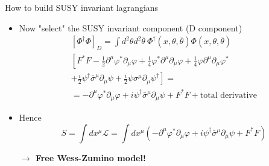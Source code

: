\documentclass[10pt]{beamer}
\begin{document}
\begin{frame}{How to build SUSY invariant lagrangians}
    \begin{itemize}[<+->]
        \item Now "select" the SUSY invariant component (D component)
        \begin{gather*}
            \left[\Phi^{\dagger}\Phi\right]_D = \int d^2\theta d^2\bar\theta \ \Phi^{\dagger}(x, \theta, \bar\theta) \Phi(x, \theta, \bar\theta) \\
            \left[F^{*} F - \frac{1}{2} \partial^{\mu} \varphi^{*} \partial_{\mu} \varphi+\frac{1}{4} \varphi^{*} \partial^{\mu} \partial_{\mu} \varphi+\frac{1}{4} \varphi \partial^{\mu} \partial_{\mu} \varphi^{*}\right. \\
                    \left.+\frac{i}{2} \psi^{\dagger} \bar{\sigma}^{\mu} \partial_{\mu} \psi+\frac{i}{2} \psi \sigma^{\mu} \partial_{\mu} \psi^{\dagger}\right] = \\
            = -\partial^{\mu}\varphi^*\partial_{\mu}\varphi + i\psi^{\dagger}\bar\sigma^{\mu}\partial_{\mu}\psi + F^{*}F + \text{total derivative}
        \end{gather*}
        \item Hence 
        \begin{equation*}
            \boxed{S = \int dx^{\mu} \mathcal{L} = \int dx^{\mu} \left( -\partial^{\mu}\varphi^{*}\partial_{\mu}\varphi + i\psi^{\dagger}\bar\sigma^{\mu}\partial_{\mu}\psi + F^{*}F \right)}
        \end{equation*}
        \centerline{\bfseries $\rightarrow$ Free Wess-Zumino model!}
    \end{itemize}
\end{frame}
\end{document}
